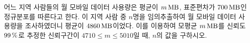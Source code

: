 어느 지역 사람들의 월 모바일 데이터 사용량은 평균이 $m\mkern3mu \mathrm{MB}$, 표준편차가 $700\mkern3mu \mathrm{MB}$인 정규분포를 따른다고 한다. 이 지역 사람 중 $n$명을 임의추출하여 월 모바일 데이터 사용량을 조사하였더니 평균이 $4860\mkern3mu \mathrm{MB}$이었다. 이를 이용하여 모평균 $m\mkern3mu \mathrm{MB}$를 신뢰도 $99\mkern3mu \%$로 추정한 신뢰구간이 $4710\le m\le 5010$일 때, $n$의 값을 구하시오. 
